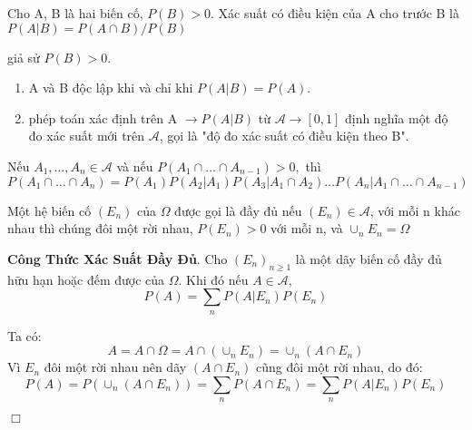 \begin{DN}
	Cho A, B là hai biến cố, $P \left(B\right) > 0.$ Xác suất có điều kiện của A cho trước B là $P \left(A \vert B\right) = P \left(A \cap B \right)/P \left(B\right) $
	\end{DN}

\begin{DL}
	giả sử  $P \left(B\right) > 0.$
	\begin{enumerate}[\qquad a{)}]
		
		\item A và B độc lập khi và chỉ khi $P \left( A  \vert B \right) =P \left( A \right)$.
		\item phép toán xác định trên A $\rightarrow P \left( A  \vert B \right)$  từ $\mathscr{A} \rightarrow [0, 1] $ định nghĩa một độ đo xác suất mới trên $\mathscr{A}$, gọi là "độ đo xác suất có điều kiện theo B".
		\end{enumerate}
	\end{DL}

\begin{DL}
	Nếu $A_1, \ldots, A_n \in \mathscr{A}$ và nếu $P \left( A_1 \cap \ldots \cap A_{n - 1} \right) >0, $ thì
	\[ P \left( A_1 \cap \ldots \cap A_n \right) = P \left( A_1 \right)P \left( A_2 \vert A_1 \right) P \left( A_3 \vert A_1 \cap A_2 \right) \ldots  P \left( A_n \vert  A_1 \cap \ldots \cap A_{n - 1} \right) \]
\end{DL}

Một hệ biến cố $\left( E_n  \right)$ của $\Omega$ được gọi là đầy đủ nếu $\left( E_n  \right) \in \mathscr{A}$, với mỗi n khác nhau thì chúng đôi một rời nhau, $P \left( E_n  \right) >0$ với mỗi n, và $\cup _n E_n = \Omega$
\begin{DL} 
\textbf{Công Thức Xác Suất Đầy Đủ}. Cho $\left( E_n  \right)_{n \ge 1}$ là một dãy biến cố đầy đủ hữu hạn hoặc đếm được của $\Omega$. Khi đó nếu $A \in \mathscr{A}$, 
\[  P \left( A  \right) = \sum \limits_n{P \left( A \vert E_n \right) }P \left( E_n  \right)  \]
\end{DL}

\begin{CM}
	
	Ta có: 
	\[ A = A \cap \Omega = A \cap \left( \cup _n E_n \right) = \cup _n \left( A \cap E_n \right)\]
	Vì $E_n$ đôi một rời nhau nên dãy $\left( A \cap E_n \right)$ cũng đôi một rời nhau, do đó:
	\[  P \left( A  \right) = P \left( \cup _n \left( A \cap E_n \right) \right) = 	\sum \limits_n{P\left( A \cap E_n \right)} =  \sum \limits_n{P \left( A \vert E_n \right) }P \left( E_n  \right) \] 
\begin{flushright}
	$\Box$
\end{flushright}
	\end{CM}
